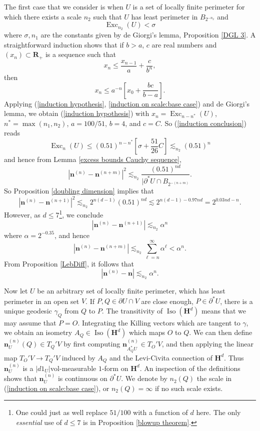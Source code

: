 \documentclass[reqno,12pt,letterpaper]{amsart}
\newcommand{\RR}{\mathbf{R}}
\newcommand{\Hyp}{\mathbf H}
\DeclareMathOperator{\Exc}{Exc}
\DeclareMathOperator{\Iso}{Iso}
\newcommand{\normal}{\mathbf n}
\newcommand{\vol}{\mathrm{vol}}
\theoremstyle{definition}
\numberwithin{equation}{section}
\begin{document}
The first case that we consider is when $U$ is a set of locally finite perimeter for which there exists a scale $n_2$ such that $U$ has least perimeter in $B_{2^{-n_2}}$ and
\begin{equation}\label{induction on scale:base case}
    \Exc_{n_2}(U) < \sigma
\end{equation}
where $\sigma, n_1$ are the constants given by de Giorgi's lemma, Proposition \ref{DGL 3}.
A straightforward induction shows that if $b > a$, $c$ are real numbers and $(x_n) \subset \RR_+$ is a sequence such that
\begin{equation}\label{induction hypothesis}
x_n \leq \frac{x_{n - 1}}{a} + \frac{c}{b^n},
\end{equation}
then
\begin{equation}\label{induction conclusion}
x_n \leq a^{-n}\left[x_0 + \frac{bc}{b - a}\right].
\end{equation}
Applying (\ref{induction hypothesis}, \ref{induction on scale:base case}) and de Giorgi's lemma, we obtain (\ref{induction hypothesis}) with $x_n = \Exc_{n - n^*}(U)$, $n^* = \max(n_1, n_2)$, $a = 100/51$, $b = 4$, and $c = C$.
So (\ref{induction conclusion}) reads
$$\Exc_n(U) \leq (0.51)^{n - n^*} \left[\sigma + \frac{51}{26}C\right] \lesssim_{n_2} (0.51)^n$$
and hence from Lemma \ref{excess bounds Cauchy sequence},
$$|\normal^{(n)} - \normal^{(n + m)}|^2 \lesssim_{n_2} \frac{(0.51)^{nd}}{|\partial^* U \cap B_{2^{-(n + m)}}}.$$
So Proposition \ref{doubling dimension} implies that
$$|\normal^{(n)} - \normal^{(n + 1)}|^2 \lesssim_{n_2} 2^{n(d - 1)} (0.51)^{nd} \lesssim 2^{n(d - 1) - 0.97 nd} = 2^{0.03nd - n}.$$
However, as $d \leq 7$\footnote{One could just as well replace $51/100$ with a function of $d$ here. The only \emph{essential} use of $d \leq 7$ is in Proposition \ref{blowup theorem}.}, we conclude
$$|\normal^{(n)} - \normal^{(n + 1)}| \lesssim_{n_2} \alpha^n$$
where $\alpha = 2^{-0.35}$, and hence
$$|\normal^{(n)} - \normal^{(n + m)}| \lesssim_{n_2} \sum_{\ell=n}^\infty \alpha^\ell < \alpha^n.$$
From Proposition \ref{LebDiff}, it follows that
\begin{equation}\label{normal convergence rate}
    |\normal^{(n)} - \normal| \lesssim_{n_2} \alpha^n.
\end{equation}

Now let $U$ be an arbitrary set of locally finite perimeter, which has least perimeter in an open set $V$.
If $P, Q \in \partial U \cap V$ are close enough, $P \in \partial^* U$, there is a unique geodesic $\gamma_Q$ from $Q$ to $P$.
The transitivity of $\Iso(\Hyp^d)$ means that we may assume that $P = O$.
Integrating the Killing vectors which are tangent to $\gamma$, we obtain an isometry $A_Q \in \Iso(\Hyp^d)$ which maps $O$ to $Q$.
We can then define $\normal^{(n)}_U(Q) \in T_Q' V$ by first computing $\normal^{(n)}_{A_Q^* U} \in T_O' V$, and then applying the linear map $T_O' V \to T_Q' V$ induced by $A_Q$ and the Levi-Civita connection of $\Hyp^d$.
Thus $\normal^{(n)}_U$ is a $|d1_U|\vol$-measurable $1$-form on $\Hyp^d$.
An inspection of the definitions shows that $\normal^{(n)}_U$ is continuous on $\partial^* U$.
We denote by $n_2(Q)$ the scale in (\ref{induction on scale:base case}), or $n_2(Q) = \infty$ if no such scale exists.
\end{document}
